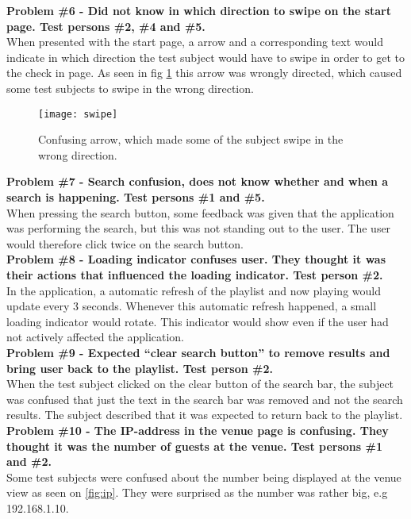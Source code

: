 \noindent\textbf{Problem \#6 - Did not know in which direction to swipe on the start page. Test
    persons \#2, \#4 and \#5.}\\
  When presented with the start page, a arrow and a corresponding text
  would indicate in which direction the test subject would have to
  swipe in order to get to the check in page. As seen in fig \cref{fig:swipe} this arrow was wrongly
  directed, which caused some test subjects to swipe in the wrong direction.\\

\begin{figure}[hbtp]
  \centering
  \texttt{[image: swipe]}
  \caption{Confusing arrow, which made some of the subject swipe in the wrong direction.}\label{fig:swipe}
\end{figure}

\noindent\textbf{Problem \#7 - Search confusion, does not know whether and when a search is
    happening. Test persons \#1 and \#5.}\\
  When pressing the search button, some feedback was given that the
  application was performing the search, but this was not standing out
  to the user. The user would therefore click twice on the search button.\\

\noindent\textbf{Problem \#8 - Loading indicator confuses user. They thought it was their actions
    that influenced the loading indicator. Test person \#2.}\\
  In the application, a automatic refresh of the playlist and
  now playing would update every 3 seconds. Whenever this automatic
  refresh happened, a small loading indicator would rotate. This
  indicator would show even if the user had not actively affected the application.\\

\noindent\textbf{Problem \#9 - Expected \enquote{clear search button}
  to remove results and bring user back to the playlist. Test person \#2.}\\
  When the test subject clicked on the clear button of the search bar,
  the subject was confused that just the text in the search bar was
  removed and not the search results. The subject described that it
  was expected to return back to the playlist.\\


\noindent\textbf{Problem \#10 - The IP-address in the venue page is
  confusing. They thought it was the number of guests at the venue. Test persons \#1 and \#2.}\\
  Some test subjects were confused about the number being displayed at
  the venue view as seen on \cref{fig:ip}. They were surprised as the number was rather big,
  e.g 192.168.1.10.\\

